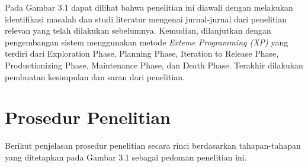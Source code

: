 Pada Gambar 3.1 dapat dilihat bahwa penelitian ini diawali dengan melakukan identifikasi masalah dan studi literatur mengenai jurnal-jurnal dari penelitian relevan yang telah dilakukan sebelumnya. Kemudian, dilanjutkan dengan pengembangan sistem menggunakan metode \textit{Exteme Programming (XP)} yang terdiri dari Exploration Phase, Planning Phase, Iteration to Release Phase, Productionizing Phase, Maintenance Phase, dan Death Phase. Terakhir dilakukan pembuatan kesimpulan dan saran dari penelitian.

\section{Prosedur Penelitian}

\noindent Berikut penjelasan prosedur penelitian secara rinci berdasarkan tahapan-tahapan yang ditetapkan pada Gambar 3.1 sebagai pedoman penelitian ini.


